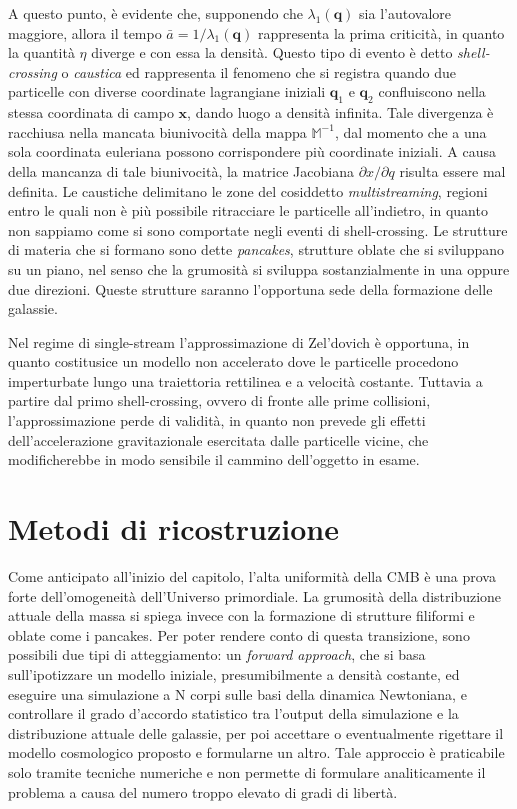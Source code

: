 A questo punto, è evidente che, supponendo che $\lambda_1(\bm{q})$ sia l'autovalore maggiore, allora il tempo 
$\bar{a}=1/\lambda_1(\bm{q})$ rappresenta la prima criticità, in quanto la quantità $\eta$ diverge e con essa la 
densità. Questo tipo di evento è detto \textit{shell-crossing} o \textit{caustica} ed rappresenta il 
fenomeno che si registra quando due particelle con diverse coordinate lagrangiane iniziali 
$\bm{q}_1$ e $\bm{q}_2$ confluiscono nella stessa coordinata di campo $\bm{x}$, dando luogo a densità
infinita. 
Tale divergenza è racchiusa nella mancata biunivocità della mappa $\mathbb{M}^{-1}$, dal momento che a 
una sola coordinata euleriana possono corrispondere più coordinate iniziali. A causa della mancanza
di tale biunivocità, la matrice Jacobiana $\partial x/\partial q$ risulta essere mal definita.
Le caustiche delimitano le zone del cosiddetto \textit{multistreaming}, regioni entro le quali non è
più possibile ritracciare le particelle all'indietro, in quanto non sappiamo come si sono comportate
negli eventi di shell-crossing. Le strutture di materia che si formano sono dette \textit{pancakes},
strutture oblate che si sviluppano su un piano, nel senso che la grumosità si sviluppa 
sostanzialmente in una oppure due direzioni. Queste strutture saranno l'opportuna sede della formazione
delle galassie.

Nel regime di single-stream l'approssimazione di Zel'dovich è opportuna, in quanto costitusice 
un modello non accelerato dove le particelle procedono imperturbate lungo una traiettoria rettilinea
 e a velocità costante. Tuttavia a partire dal primo shell-crossing, ovvero di fronte alle prime collisioni,
l'approssimazione perde di validità, 
in quanto non prevede gli effetti dell'accelerazione gravitazionale esercitata dalle particelle vicine, che 
modificherebbe in modo sensibile il cammino dell'oggetto in esame. 

\section{Metodi di ricostruzione}
\label{sec:metodi}

Come anticipato all'inizio del capitolo, l'alta uniformità della CMB è una prova forte dell'omogeneità 
dell'Universo primordiale. La grumosità della distribuzione attuale della massa si spiega invece con 
la formazione di strutture filiformi e oblate come i pancakes. Per poter rendere conto di questa transizione,
sono possibili due tipi di atteggiamento: un \textit{forward approach}, che si basa sull'ipotizzare un 
modello iniziale, presumibilmente a densità costante, ed eseguire una simulazione a N corpi sulle basi 
della dinamica Newtoniana, e controllare il grado d'accordo statistico tra l'output della simulazione e la 
distribuzione attuale delle galassie, per poi accettare o eventualmente rigettare il modello cosmologico proposto
e formularne un altro.
Tale approccio è praticabile solo tramite tecniche numeriche e non permette di formulare analiticamente
il problema a causa del numero troppo elevato di gradi di libertà.

